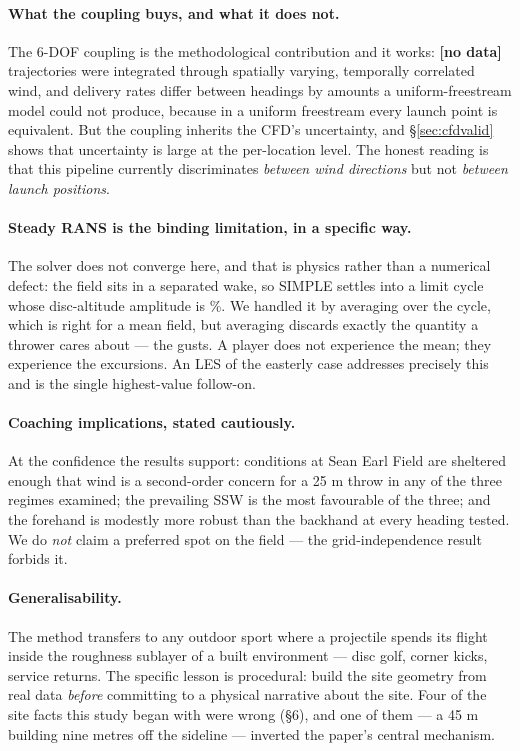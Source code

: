 \documentclass[11pt,letterpaper]{article}
\newcommand{\MISSINGNUM}{\textbf{\color{red}[no data]}}%
\newcommand{\NtotalThrows}{\MISSINGNUM}\newcommand{\NthrowsPerCell}{\MISSINGNUM}%
\begin{document}
\paragraph{What the coupling buys, and what it does not.} The 6-DOF coupling is
the methodological contribution and it works: \NtotalThrows{} trajectories were
integrated through spatially varying, temporally correlated wind, and delivery
rates differ between headings by amounts a uniform-freestream model could not
produce, because in a uniform freestream every launch point is equivalent. But
the coupling inherits the CFD's uncertainty, and \S\ref{sec:cfdvalid} shows that
uncertainty is large at the per-location level. The honest reading is that this
pipeline currently discriminates \emph{between wind directions} but not
\emph{between launch positions}.

\paragraph{Steady RANS is the binding limitation, in a specific way.} The solver
does not converge here, and that is physics rather than a numerical defect: the
field sits in a separated wake, so SIMPLE settles into a limit cycle whose
disc-altitude amplitude is \ConvFine\%. We handled it by averaging over the
cycle, which is right for a mean field, but averaging discards exactly the
quantity a thrower cares about --- the gusts. A player does not experience the
mean; they experience the excursions. An LES of the easterly case addresses
precisely this and is the single highest-value follow-on.

\paragraph{Coaching implications, stated cautiously.} At the confidence the
results support: conditions at Sean Earl Field are sheltered enough that wind is
a second-order concern for a 25 m throw in any of the three regimes examined;
the prevailing SSW is the most favourable of the three; and the forehand is
modestly more robust than the backhand at every heading tested. We do \emph{not}
claim a preferred spot on the field --- the grid-independence result forbids it.

\paragraph{Generalisability.} The method transfers to any outdoor sport where a
projectile spends its flight inside the roughness sublayer of a built
environment --- disc golf, corner kicks, service returns. The specific lesson is
procedural: build the site geometry from real data \emph{before} committing to a
physical narrative about the site. Four of the site facts this study began with
were wrong (\S6), and one of them --- a 45 m building nine metres off the
sideline --- inverted the paper's central mechanism.
\end{document}
